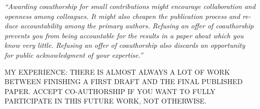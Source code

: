 \documentclass[portrait,11pt]{seminar}
\begin{document}
{\it ``Awarding coauthorship for small contributions might encourage collaboration and openness among colleagues. It might also cheapen the publication process and re- duce accountability among the primary authors. Refusing an offer of coauthorship prevents you from being accountable for the results in a paper about which you know very little. Refusing an offer of coauthorship also discards an opportunity for public acknowledgment of your expertise.''}

\medskip

MY EXPERIENCE: THERE IS ALMOST ALWAYS A LOT OF WORK BETWEEN FINISHING A FIRST DRAFT AND THE FINAL PUBLISHED PAPER. ACCEPT CO-AUTHORSHIP IF YOU WANT TO FULLY PARTICIPATE IN THIS FUTURE WORK, NOT OTHERWISE. 






\es
\end{document}
